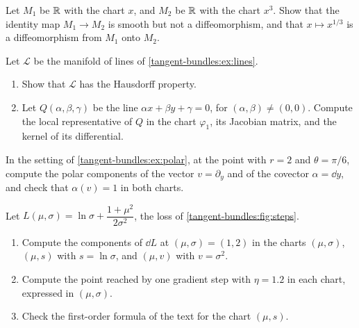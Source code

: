 \begin{notechapter}
\begin{exercise}\label{tangent-bundles:exr:2}
Let $M_1$ be $\mathbb{R}$ with the chart $x$, and $M_2$ be $\mathbb{R}$ with the chart
$x^3$. Show that the identity map $M_1\to M_2$ is smooth but not a
diffeomorphism, and that $x\mapsto x^{1/3}$ is a diffeomorphism from
$M_1$ onto $M_2$.
\end{exercise}

\begin{exercise}\label{tangent-bundles:exr:3}
Let $\mathcal L$ be the manifold of lines of
\cref{tangent-bundles:ex:lines}.
\begin{enumerate}[nosep]
  \item Show that $\mathcal L$ has the Hausdorff property.
  \item Let $Q(\alpha, \beta, \gamma)$ be the line
        $\alpha x + \beta y + \gamma = 0$, for
        $(\alpha, \beta)\neq(0, 0)$. Compute the local representative of
        $Q$ in the chart $\varphi_1$, its Jacobian matrix, and the kernel
        of its differential.
\end{enumerate}
\end{exercise}

\begin{exercise}\label{tangent-bundles:exr:4}
In the setting of \cref{tangent-bundles:ex:polar}, at the point with
$r = 2$ and $\theta = \pi/6$, compute the polar components of the vector
$v = \partial_y$ and of the covector $\alpha = \dd y$, and check that
$\alpha(v) = 1$ in both charts.
\end{exercise}

\begin{exercise}\label{tangent-bundles:exr:5}
Let $L(\mu, \sigma) = \ln\sigma + \dfrac{1 + \mu^2}{2\sigma^2}$, the loss
of \cref{tangent-bundles:fig:steps}.
\begin{enumerate}[nosep]
  \item Compute the components of $\dd L$ at $(\mu, \sigma) = (1, 2)$ in
        the charts $(\mu, \sigma)$, $(\mu, s)$ with $s = \ln\sigma$, and
        $(\mu, v)$ with $v = \sigma^2$.
  \item Compute the point reached by one gradient step with $\eta = 1.2$
        in each chart, expressed in $(\mu, \sigma)$.
  \item Check the first-order formula of the text for the chart
        $(\mu, s)$.
\end{enumerate}
\end{exercise}


\end{notechapter}
